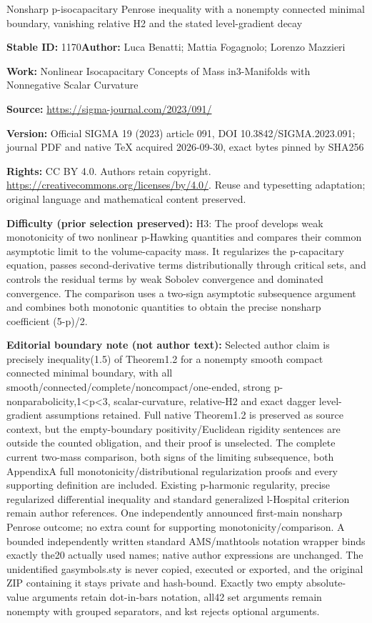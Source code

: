 \documentclass[11pt]{article}
\numberwithin{equation}{section}
\numberwithin{equation}{section}
\begin{document}
\begin{center}\Large Nonsharp p-isocapacitary Penrose inequality with a nonempty connected minimal boundary, vanishing relative H2 and the stated level-gradient decay\end{center}
\noindent\textbf{Stable ID:} 1170\quad\textbf{Author:} Luca Benatti; Mattia Fogagnolo; Lorenzo Mazzieri\par
\noindent\textbf{Work:} Nonlinear Isocapacitary Concepts of Mass in3-Manifolds with Nonnegative Scalar Curvature\par
\noindent\textbf{Source:} \url{https://sigma-journal.com/2023/091/}\par
\noindent\textbf{Version:} Official SIGMA 19 (2023) article 091, DOI 10.3842/SIGMA.2023.091; journal PDF and native TeX acquired 2026-09-30, exact bytes pinned by SHA256\par
\noindent\textbf{Rights:} CC BY 4.0. Authors retain copyright. \url{https://creativecommons.org/licenses/by/4.0/}. Reuse and typesetting adaptation; original language and mathematical content preserved.\par
\noindent\textbf{Difficulty (prior selection preserved):} {\CJKfont H3: The proof develops weak monotonicity of two nonlinear p-Hawking quantities and compares their common asymptotic limit to the volume-capacity mass. It regularizes the p-capacitary equation, passes second-derivative terms distributionally through critical sets, and controls the residual terms by weak Sobolev convergence and dominated convergence. The comparison uses a two-sign asymptotic subsequence argument and combines both monotonic quantities to obtain the precise nonsharp coefficient (5-p)/2.}\par
\medskip\noindent\textbf{Editorial boundary note (not author text):} Selected author claim is precisely inequality(1.5) of Theorem1.2 for a nonempty smooth compact connected minimal boundary, with all smooth/connected/complete/noncompact/one-ended, strong p-nonparabolicity,1<p<3, scalar-curvature, relative-H2 and exact dagger level-gradient assumptions retained. Full native Theorem1.2 is preserved as source context, but the empty-boundary positivity/Euclidean rigidity sentences are outside the counted obligation, and their proof is unselected. The complete current two-mass comparison, both signs of the limiting subsequence, both AppendixA full monotonicity/distributional regularization proofs and every supporting definition are included. Existing p-harmonic regularity, precise regularized differential inequality and standard generalized l-Hospital criterion remain author references. One independently announced first-main nonsharp Penrose outcome; no extra count for supporting monotonicity/comparison. A bounded independently written standard AMS/mathtools notation wrapper binds exactly the20 actually used names; native author expressions are unchanged. The unidentified gasymbols.sty is never copied, executed or exported, and the original ZIP containing it stays private and hash-bound. Exactly two empty absolute-value arguments retain dot-in-bars notation, all42 set arguments remain nonempty with grouped separators, and kst rejects optional arguments.\par
\end{document}
